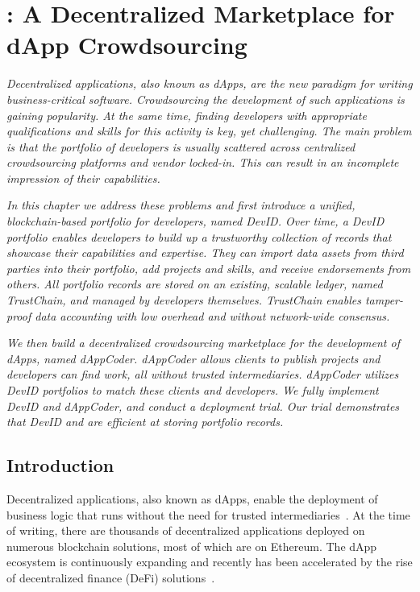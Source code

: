 \chapter{\Dappcoder{}: A Decentralized Marketplace for dApp Crowdsourcing}
\label{chapter:devid}

\emph{Decentralized applications, also known as dApps, are the new paradigm for writing business-critical software.
Crowdsourcing the development of such applications is gaining popularity.
At the same time, finding developers with appropriate qualifications and skills for this activity is key, yet challenging.
The main problem is that the portfolio of developers is usually scattered across centralized crowdsourcing platforms and vendor locked-in.
This can result in an incomplete impression of their capabilities.}

\emph{In this chapter we address these problems and first introduce a unified, blockchain-based portfolio for developers, named \emph{DevID}.
Over time, a DevID portfolio enables developers to build up a trustworthy collection of records that showcase their capabilities and expertise.
They can import data assets from third parties into their portfolio, add projects and skills, and receive endorsements from others.
All portfolio records are stored on an existing, scalable ledger, named TrustChain, and managed by developers themselves.
TrustChain enables tamper-proof data accounting with low overhead and without network-wide consensus.}

\emph{We then build a decentralized crowdsourcing marketplace for the development of dApps, named \emph{dAppCoder}.
dAppCoder allows clients to publish projects and developers can find work, all without trusted intermediaries.
dAppCoder utilizes DevID portfolios to match these clients and developers.
We fully implement DevID and dAppCoder, and conduct a deployment trial.
Our trial demonstrates that DevID and \Dappcoder{} are efficient at storing portfolio records. }

\newpage

\section{Introduction}
Decentralized applications, also known as dApps, enable the deployment of business logic that runs without the need for trusted intermediaries~\cite{raval2016decentralized}.
At the time of writing, there are thousands of decentralized applications deployed on numerous blockchain solutions, most of which are on Ethereum.
The dApp ecosystem is continuously expanding and recently has been accelerated by the rise of decentralized finance (DeFi) solutions~\cite{zetzsche2020decentralized}.

